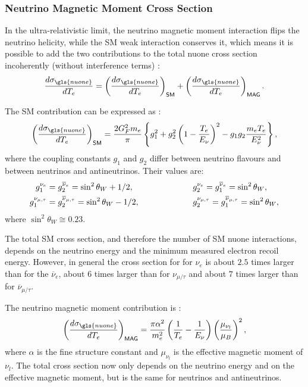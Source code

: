 \subsubsection{Neutrino Magnetic Moment Cross Section}
In the ultra-relativistic limit, the neutrino magnetic moment interaction flips the neutrino helicity, while the \gls{SM} weak interaction conserves it, which means it is possible to add the two contributions to the total \gls{nuone} cross section incoherently (without interference terms) \cite{nuElmagInt2015.pdf}:
\begin{equation}
\frac{d\sigma_{\gls{nuone}}}{dT_e}=\left(\frac{d\sigma_{\gls{nuone}}}{dT_e}\right)_{\textsf{SM}}+\left(\frac{d\sigma_{\gls{nuone}}}{dT_e}\right)_{\textsf{MAG}}.
\end{equation}

The \gls{SM} contribution can be expressed as \cite{FundamentalsOfNeutrinoPhysics.pdf, nuElmagInt2015.pdf}:
\begin{equation}\label{eq:NuMMSMCrossSection}
\left(\frac{d\sigma_{\gls{nuone}}}{dT_e}\right)_{\textsf{SM}}=\frac{2G_F^2m_e}{\pi}\left\lbrace g_1^2+g_2^2\left(1-\frac{T_e}{E_{\nu}}\right)^2-g_1 g_2\frac{m_eT_e}{E_{\nu}^2}\right\rbrace,
\end{equation}
where the coupling constants $g_1$ and $g_2$ differ between neutrino flavours and between neutrinos and antineutrinos. Their values are:
\begin{align}
g_1^{\nu_e}&=g_2^{\overline{\nu}_e}=\sin^2\theta_W+1/2,\hspace{2.5cm} g_2^{\nu_e}=g_1^{\overline{\nu}_e}=\sin^2\theta_W,\\
g_1^{\nu_{\mu,\tau}}&=g_2^{\overline{\nu}_{\mu,\tau}}=\sin^2\theta_W-1/2,\hspace{2.25cm} g_2^{\nu_{\mu,\tau}}=g_1^{\overline{\nu}_{\mu,\tau}}=\sin^2\theta_W,
\end{align}
where $\sin^2\theta_W\cong 0.23$.

The total \gls{SM} cross section, and therefore the number of \gls{SM} \gls{nuone} interactions, depends on the neutrino energy and the minimum measured electron recoil energy. However, in general the cross section for for $\nu_e$ is about $2.5$ times larger than for the $\overline{\nu}_e$, about $6$ times larger than for $\nu_{\mu/\tau}$ and about $7$ times larger than for $\overline{\nu}_{\mu/\tau}$.

The neutrino magnetic moment contribution is \cite{NeutrinoElmagFormFactors1989.pdf, nuElmagInt2015.pdf}:
\begin{equation}\label{eq:NuMMMMCrossSection}
\left(\frac{d\sigma_{\gls{nuone}}}{dT_e}\right)_{\textsf{MAG}}=\frac{\pi\alpha^2}{m_e^2}\left(\frac{1}{T_e}-\frac{1}{E_{\nu}}\right)\left(\frac{\mu_{\nu_l}}{\mu_B}\right)^2,
\end{equation}
where $\alpha$ is the fine structure constant and $\mu_{\nu_l}$ is the effective magnetic moment of $\nu_l$. The total cross section now only depends on the neutrino energy and on the effective magnetic moment, but is the same for neutrinos and antineutrinos.

